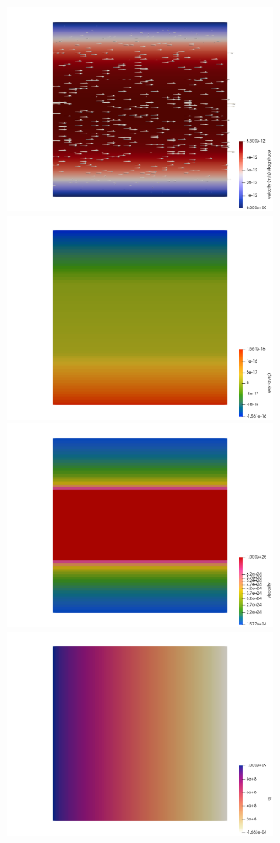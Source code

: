 \begin{center}
\includegraphics[width=7.8cm]{python_codes/fieldstone_61/results/n_1/vel.png}
\includegraphics[width=7.8cm]{python_codes/fieldstone_61/results/n_1/exy.png}\\
\includegraphics[width=7.8cm]{python_codes/fieldstone_61/results/n_1/eta.png}
\includegraphics[width=7.8cm]{python_codes/fieldstone_61/results/n_1/press.png}
\end{center}





